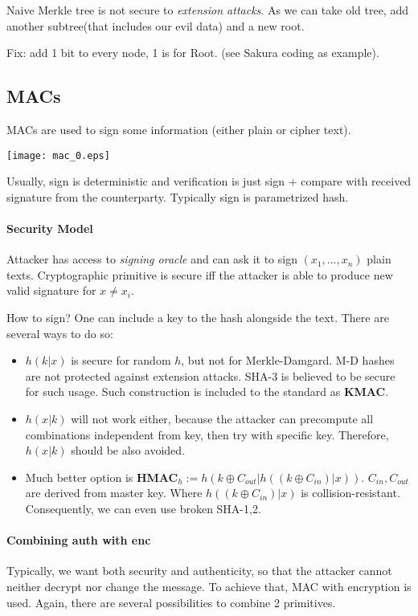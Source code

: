 \begin{observation}
	Naive Merkle tree is not secure to \emph{extension attacks}.
	As we can take old tree, add another subtree(that includes our evil data) and a new root.

	Fix: add 1 bit to every node, 1 is for Root. (see Sakura coding as example).
\end{observation}

\subsection{MACs}
MACs are used to sign some information (either plain or cipher text).

\texttt{[image: mac\_0.eps]}

Usually, sign is deterministic and verification is just sign + compare with received signature from the counterparty.
Typically sign is parametrized hash.

\paragraph{Security Model}
Attacker has access to \emph{signing oracle} and can ask it to sign $(x_1, ..., x_n)$ plain texts.
Cryptographic primitive is secure iff the attacker is able to produce new valid signature for $x \neq x_i$.

How to sign? One can include a key to the hash alongside the text. There are several ways to do so:

\begin{itemize}
	\item $h(k | x)$ is secure for random $h$, but not for Merkle-Damgard.
		M-D hashes are not protected against extension attacks. SHA-3 is believed to be secure for such usage. Such construction is included to the standard as \textbf{KMAC}.
	\item $h(x | k)$ will not work either, because the attacker can precompute all combinations independent from key, then try with specific key. Therefore, $h(x | k)$ should be also avoided.
	\item Much better option is \textbf{HMAC}$_h := h(k \oplus C_{out} | h((k \oplus C_{in}) | x))$.
	$C_{in}, C_{out}$ are derived from master key. Where $h((k \oplus C_{in}) | x)$ is collision-resistant. Consequently, we can even use broken SHA-1,2.
\end{itemize}

\paragraph{Combining auth with enc}
Typically, we want both security and authenticity, so that the attacker cannot neither decrypt nor change the message. To achieve that, MAC with encryption is used.
Again, there are several possibilities to combine 2 primitives.

